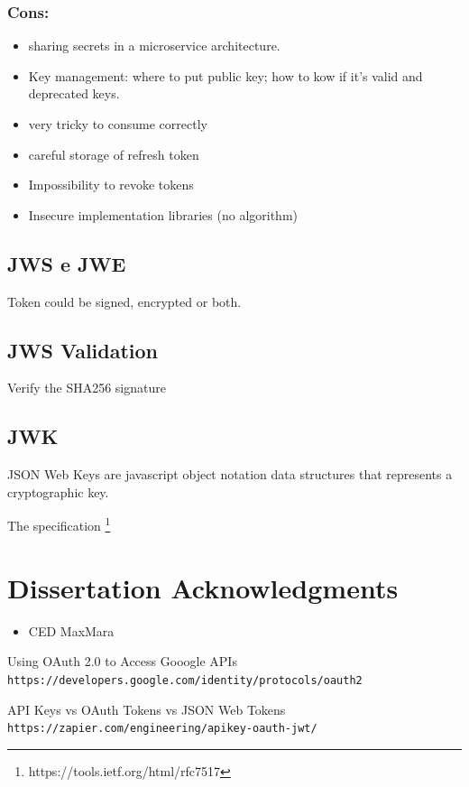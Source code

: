 \documentclass[11pt]{style}
\begin{document}
\subsubsection{Cons:}
\begin{itemize}
    \item sharing secrets in a microservice architecture.
    \item Key management: where to put public key; how to kow if it's valid and
        deprecated keys.
    \item very tricky to consume correctly
    \item careful storage of refresh token
    \item Impossibility to revoke tokens
    \item Insecure implementation libraries (no algorithm)
\end{itemize}

\subsection{JWS e JWE}
Token could be signed, encrypted or both.

\subsection{JWS Validation}
Verify the SHA256 signature

\subsection{JWK}
JSON Web Keys are javascript object notation data structures that represents a
cryptographic key.

The specification \footnote{https://tools.ietf.org/html/rfc7517}

\section{Dissertation Acknowledgments}
\begin{itemize}
    \item CED MaxMara
\end{itemize}

\begin{thebibliography}{9}
    Using OAuth 2.0 to Access Gooogle APIs
    \\
    \texttt{https://developers.google.com/identity/protocols/oauth2}

    API Keys vs OAuth Tokens vs JSON Web Tokens
    \\
    \texttt{https://zapier.com/engineering/apikey-oauth-jwt/}

\end{thebibliography}

\newpage
\end{document}
